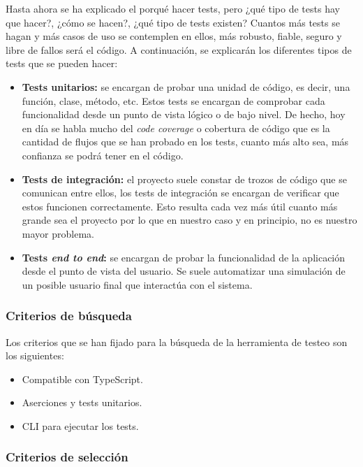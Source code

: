 Hasta ahora se ha explicado el porqué hacer tests, pero ¿qué tipo de tests hay que hacer?, ¿cómo se hacen?, ¿qué tipo de tests existen? Cuantos más tests se hagan y más casos de uso se contemplen en ellos, más robusto, fiable, seguro y libre de fallos será el código. A continuación, se explicarán los diferentes tipos de tests que se pueden hacer:

\begin{itemize}
    \item \textbf{Tests unitarios:} se encargan de probar una unidad de código, es decir, una función, clase, método, etc. Estos tests se encargan de comprobar cada funcionalidad desde un punto de vista lógico o de bajo nivel. De hecho, hoy en día se habla mucho del \textit{code coverage} o cobertura de código que es la cantidad de flujos que se han probado en los tests, cuanto más alto sea, más confianza se podrá tener en el código.
    \item \textbf{Tests de integración:} el proyecto suele constar de trozos de código que se comunican entre ellos, los tests de integración se encargan de verificar que estos funcionen correctamente. Esto resulta cada vez más útil cuanto más grande sea el proyecto por lo que en nuestro caso y en principio, no es nuestro mayor problema.
    \item \textbf{Tests \textit{end to end}:} se encargan de probar la funcionalidad de la aplicación desde el punto de vista del usuario. Se suele automatizar una simulación de un posible usuario final que interactúa con el sistema.
\end{itemize}

\subsubsection{Criterios de búsqueda}

Los criterios que se han fijado para la búsqueda de la herramienta de testeo son los siguientes:

\begin{itemize}
    \item Compatible con TypeScript.
    \item Aserciones y tests unitarios.
    \item CLI para ejecutar los tests.
\end{itemize}

\subsubsection{Criterios de selección}

